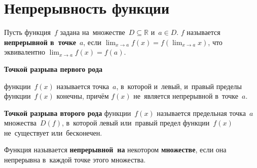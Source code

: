 \section{Непрерывность функции}
\hypertarget{def:continuity_of_function}{} Пусть функция~$f$ задана на~множестве~$D \subseteq \mathbb R$ и~$a \in D$.
$f$ называется \textbf{непрерывной в~точке}~$a$, если $\displaystyle \lim_{x \to a} f(x) = f(\lim_{x \to a} x)$, что эквивалентно $\displaystyle \lim_{x \to a} f(x) = f(a)$.

\hypertarget{def:point_of_discontinuity_of_function}{\textbf{Точкой разрыва первого рода}} функции~$f(x)$ называется точка~$a$, в~которой и~левый, и~правый пределы функции~$f(x)$ конечны, причём $f(x)$ не~является непрерывной в~точке~$a$.

\textbf{Точкой разрыва второго рода} функции~$f(x)$ называется предельная точка~$a$ множества~$D(f)$, в~которой левый или~правый предел функции~$f(x)$ не~существует или~бесконечен.

Функция называется \textbf{непрерывной~на} некотором \textbf{множестве}, если она непрерывна в~каждой точке этого множества.